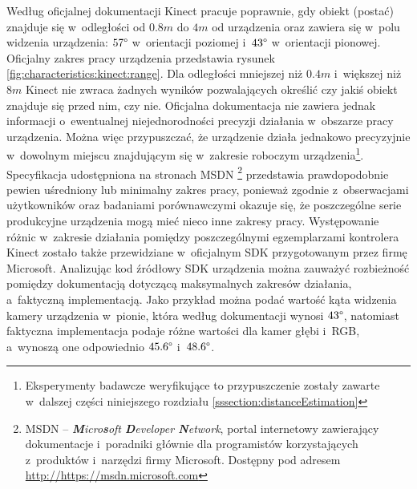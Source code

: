 Według oficjalnej dokumentacji Kinect pracuje poprawnie, gdy obiekt (postać) znajduje się w~odległości od $0.8m$ do $4m$ od urządzenia oraz zawiera się w~polu widzenia urządzenia: $57\degree$ w~orientacji poziomej i~$43\degree$ w~orientacji pionowej. Oficjalny zakres pracy urządzenia przedstawia rysunek \ref{fig:characteristics:kinect:range}. Dla odległości mniejszej niż $0.4m$ i~większej niż $8m$ Kinect nie zwraca żadnych wyników pozwalających określić czy jakiś obiekt znajduje się przed nim, czy nie. Oficjalna dokumentacja nie zawiera jednak informacji o~ewentualnej niejednorodności precyzji działania w~obszarze pracy urządzenia. Można więc przypuszczać, że urządzenie działa jednakowo precyzyjnie w~dowolnym miejscu znajdującym się w~zakresie roboczym urządzenia{\footnote{Eksperymenty badawcze weryfikujące to przypuszczenie zostały zawarte w~dalszej części niniejszego rozdziału \ref{sssection:distanceEstimation}}}. Specyfikacja udostępniona na stronach MSDN \footnote{MSDN -- \emph{\textbf{M}icro\textbf{s}oft \textbf{D}eveloper \textbf{N}etwork}, portal internetowy zawierający dokumentacje i~poradniki głównie dla programistów korzystających z~produktów i~narzędzi firmy Microsoft. Dostępny pod adresem \url{http://https://msdn.microsoft.com}} przedstawia prawdopodobnie pewien uśredniony lub minimalny zakres pracy, ponieważ zgodnie z~obserwacjami użytkowników oraz badaniami porównawczymi \cite{DiFilippo2015} okazuje się, że poszczególne serie produkcyjne urządzenia mogą mieć nieco inne zakresy pracy. Występowanie różnic w~zakresie działania pomiędzy poszczególnymi egzemplarzami kontrolera Kinect zostało także przewidziane w~oficjalnym SDK przygotowanym przez firmę Microsoft{}. Analizując kod źródłowy SDK urządzenia można zauważyć rozbieżność pomiędzy dokumentacją dotyczącą maksymalnych zakresów działania, a~faktyczną implementacją. Jako przykład można podać wartość kąta widzenia kamery urządzenia w~pionie, która według dokumentacji wynosi $43\degree$, natomiast faktyczna implementacja podaje różne wartości dla kamer głębi i~RGB, a~wynoszą one odpowiednio $45.6\degree$ i~$48.6\degree$. 
																															
